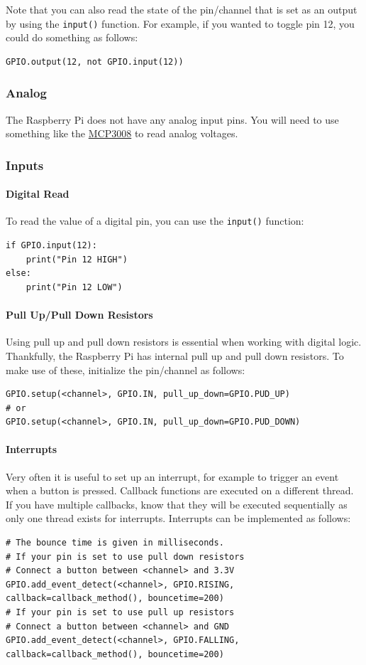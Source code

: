 Note that you can also read the state of the pin/channel that is set as an output by using the \verb|input()| function. For example, if you wanted to toggle pin 12, you could do something as follows:
\begin{lstlisting}
GPIO.output(12, not GPIO.input(12))
\end{lstlisting}


\subsubsection{Analog}
The Raspberry Pi does not have any analog input pins. You will need to use something like the \href{https://cdn-shop.adafruit.com/datasheets/MCP3008.pdf}{MCP3008} to read analog voltages.


\subsubsection{Inputs}
\paragraph{Digital Read}
To read the value of a digital pin, you can use the \verb|input()| function:
\begin{lstlisting}
if GPIO.input(12):
    print("Pin 12 HIGH")
else:
    print("Pin 12 LOW")
\end{lstlisting}

\paragraph{Pull Up/Pull Down Resistors}
Using pull up and pull down resistors is essential when working with digital logic. Thankfully, the Raspberry Pi has internal pull up and pull down resistors. To make use of these, initialize the pin/channel as follows:
\begin{lstlisting}
GPIO.setup(<channel>, GPIO.IN, pull_up_down=GPIO.PUD_UP)
# or
GPIO.setup(<channel>, GPIO.IN, pull_up_down=GPIO.PUD_DOWN)
\end{lstlisting}

\paragraph{Interrupts} 
Very often it is useful to set up an interrupt, for example to trigger an event when a button is pressed. Callback functions are executed on a different thread. If you have multiple callbacks, know that they will be executed sequentially as only one thread exists for interrupts. Interrupts can be implemented as follows:
\begin{lstlisting}
# The bounce time is given in milliseconds.
# If your pin is set to use pull down resistors
# Connect a button between <channel> and 3.3V
GPIO.add_event_detect(<channel>, GPIO.RISING, callback=callback_method(), bouncetime=200)
# If your pin is set to use pull up resistors
# Connect a button between <channel> and GND
GPIO.add_event_detect(<channel>, GPIO.FALLING, callback=callback_method(), bouncetime=200)  
\end{lstlisting}

